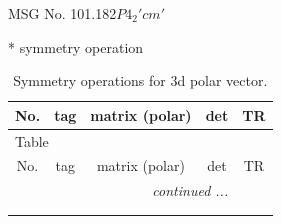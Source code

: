\documentclass[fleqn,8pt]{jsarticle}
\begin{document}
\setcounter{MaxMatrixCols}{32}

\renewcommand{\tablename}{Table~}
\renewcommand{\figurename}{Figure~}
\begin{center}
\LARGE
MSG No. 101.182\quad$P4_{2}'cm'$
\end{center}
* symmetry operation
\renewcommand{\arraystretch}{1.3}
\begin{longtable}{ccccc}
\caption{Symmetry operations for 3d polar vector.}
 \\
 \hline \hline
No. & tag & matrix (polar) & det & TR \\ \hline \endfirsthead

\multicolumn{4}{l}{\tablename\ \thetable{}} \\
 \hline \hline
No. & tag & matrix (polar) & det & TR \\ \hline \endhead

 \hline \hline
\multicolumn{4}{r}{\footnotesize\it continued ...} \\ \endfoot

 \hline \hline
\multicolumn{4}{r}{} \\ \endlastfoot


\end{longtable}
\end{document}
